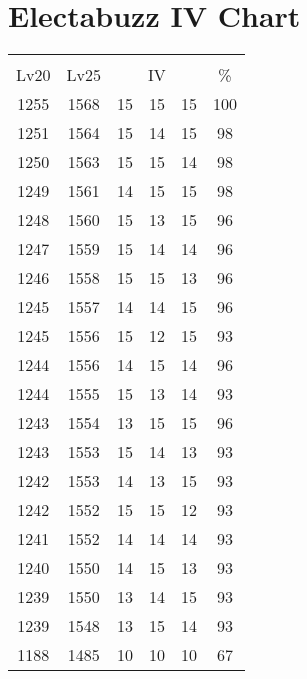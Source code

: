 \documentclass{article}%
\begin{document}
%
\normalsize%
\section{Electabuzz IV Chart}%
\label{sec:Electabuzz IV Chart}%
\renewcommand{\arraystretch}{1.5}%
\begin{tabular}{|c|c|c|c|c|c|}%
\hline%
\multicolumn{6}{|c|}{\textcolor{white}{ 
\linebreak{Electabuzz}
}%
\cellcolor{black}}\\%
\multicolumn{1}{|c}{Lv20}&\multicolumn{1}{c|}{Lv25}&\multicolumn{3}{c|}{IV}&\multicolumn{1}{|c|}{\%}\\%
\hline%
\rowcolor{color100}%
1255&1568&15&15&15&100\\%
\hline%
\rowcolor{color98}%
1251&1564&15&14&15&98\\%
\hline%
\rowcolor{color98}%
1250&1563&15&15&14&98\\%
\hline%
\rowcolor{color98}%
1249&1561&14&15&15&98\\%
\hline%
\rowcolor{color96}%
1248&1560&15&13&15&96\\%
\hline%
\rowcolor{color96}%
1247&1559&15&14&14&96\\%
\hline%
\rowcolor{color96}%
1246&1558&15&15&13&96\\%
\hline%
\rowcolor{color96}%
1245&1557&14&14&15&96\\%
\hline%
\rowcolor{color93}%
1245&1556&15&12&15&93\\%
\hline%
\rowcolor{color96}%
1244&1556&14&15&14&96\\%
\hline%
\rowcolor{color93}%
1244&1555&15&13&14&93\\%
\hline%
\rowcolor{color96}%
1243&1554&13&15&15&96\\%
\hline%
\rowcolor{color93}%
1243&1553&15&14&13&93\\%
\hline%
\rowcolor{color93}%
1242&1553&14&13&15&93\\%
\hline%
\rowcolor{color93}%
1242&1552&15&15&12&93\\%
\hline%
\rowcolor{color93}%
1241&1552&14&14&14&93\\%
\hline%
\rowcolor{color93}%
1240&1550&14&15&13&93\\%
\hline%
\rowcolor{color93}%
1239&1550&13&14&15&93\\%
\hline%
\rowcolor{color93}%
1239&1548&13&15&14&93\\%
\hline%
\rowcolor{color91}%
1188&1485&10&10&10&67\\%
\end{tabular}

%
\end{document}

